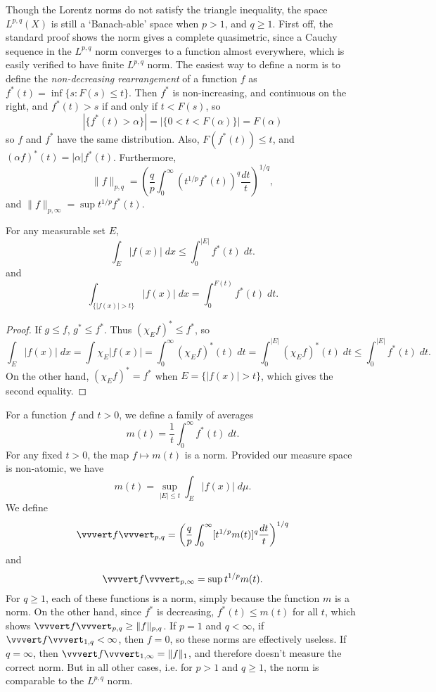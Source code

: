 Though the Lorentz norms do not satisfy the triangle inequality, the space $L^{p,q}(X)$ is still a `Banach-able' space when $p > 1$, and $q \geq 1$. First off, the standard proof shows the norm gives a complete quasimetric, since a Cauchy sequence in the $L^{p,q}$ norm converges to a function almost everywhere, which is easily verified to have finite $L^{p,q}$ norm. The easiest way to define a norm is to define the \emph{non-decreasing rearrangement} of a function $f$ as $f^*(t) = \inf \{ s: F(s) \leq t \}$. Then $f^*$ is non-increasing, and continuous on the right, and $f^*(t) > s$ if and only if $t < F(s)$, so
%
\[ |\{ f^*(t) > \alpha \}| = |\{ 0 < t < F(\alpha) \}| = F(\alpha) \]
%
so $f$ and $f^*$ have the same distribution. Also, $F(f^*(t)) \leq t$, and $(\alpha f)^*(t) = |\alpha| f^*(t)$. Furthermore,
%
\[ \| f \|_{p,q} = \left( \frac{q}{p} \int_0^\infty (t^{1/p} f^*(t))^q \frac{dt}{t} \right)^{1/q}, \]
%
and $\| f \|_{p,\infty} = \sup t^{1/p} f^*(t)$.

\begin{lemma}
    For any measurable set $E$,
    \[ \int_E |f(x)|\; dx \leq \int_0^{|E|} f^*(t)\; dt. \]
    and
    \[ \int_{\{ |f(x)| > t \}} |f(x)|\; dx = \int_0^{F(t)} f^*(t)\; dt. \]
\end{lemma}
\begin{proof}
    If $g \leq f$, $g^* \leq f^*$. Thus $(\chi_E f)^* \leq f^*$, so
    \[ \int_E |f(x)|\; dx = \int \chi_E |f(x)| = \int_0^\infty (\chi_E f)^*(t)\; dt = \int_0^{|E|} (\chi_E f)^*(t)\; dt \leq \int_0^{|E|} f^*(t)\; dt. \]
    On the other hand, $(\chi_E f)^* = f^*$ when $E = \{ |f(x)| > t \}$, which gives the second equality.
\end{proof}

For a function $f$ and $t > 0$, we define a family of averages
%
\[ m(t) = \frac{1}{t} \int_0^\infty f^*(t)\; dt. \]
%
For any fixed $t > 0$, the map $f \mapsto m(t)$ is a norm. Provided our measure space is non-atomic, we have
%
\[ m(t) = \sup_{|E| \leq t} \int_E |f(x)|\; d\mu. \]
%
We define
%
\[ \vvvert f \vvvert_{p,q} = \left( \frac{q}{p} \int_0^\infty [t^{1/p} m(t)]^q \frac{dt}{t} \right)^{1/q} \]
and
%
\[ \vvvert f \vvvert_{p,\infty} = \sup t^{1/p} m(t). \]
%
For $q \geq 1$, each of these functions is a norm, simply because the function $m$ is a norm. On the other hand, since $f^*$ is decreasing, $f^*(t) \leq m(t)$ for all $t$, which shows $\vvvert f \vvvert_{p,q} \geq \| f \|_{p,q}$. If $p = 1$ and $q < \infty$, if $\vvvert f \vvvert_{1,q} < \infty$, then $f = 0$, so these norms are effectively useless. If $q = \infty$, then $\vvvert f \vvvert_{1,\infty} = \| f \|_1$, and therefore doesn't measure the correct norm. But in all other cases, i.e. for $p > 1$ and $q \geq 1$, the norm is comparable to the $L^{p,q}$ norm.

